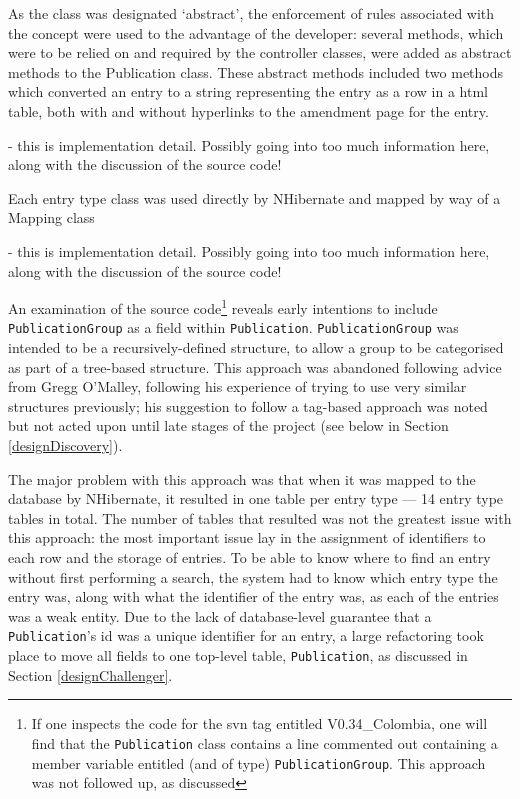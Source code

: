 As the class was designated `abstract', the enforcement of rules associated with the concept were used to the advantage of the developer: several methods, which were to be relied on and required by the controller classes, were added as abstract methods to the Publication class.  These abstract methods included two methods which converted an entry to a string representing the entry as a row in a \gls{html} table, both with and without hyperlinks to the amendment page for the entry.

\revisit - this is implementation detail. Possibly going into too much information here, along with the discussion of the source code!

Each entry type class was used directly by NHibernate and mapped by way of a Mapping class 

\revisit - this is implementation detail. Possibly going into too much information here, along with the discussion of the source code!

An examination of the source code\footnote{If one inspects the code for the \gls{svn} tag entitled V0.34\_Colombia, one will find that the \texttt{Publication} class contains a line commented out containing a member variable entitled (and of type) \texttt{PublicationGroup}.  This approach was not followed up, as discussed} reveals early intentions to include \texttt{PublicationGroup} as a field within \texttt{Publication}.  \texttt{PublicationGroup} was intended to be a recursively-defined structure, to allow a group to be categorised as part of a tree-based structure.  This approach was abandoned following advice from Gregg O'Malley, following his experience of trying to use very similar structures previously; his suggestion to follow a tag-based approach was noted but not acted upon until late stages of the project (see below in Section \ref{designDiscovery}).

The major problem with this approach was that when it was mapped to the database by NHibernate, it resulted in one table per entry type --- 14 entry type tables in total.  The number of tables that resulted was not the greatest issue with this approach: the most important issue lay in the assignment of identifiers to each row and the storage of entries.  To be able to know where to find an entry without first performing a search, the system had to know which entry type the entry was, along with what the identifier of the entry was, as each of the entries was a weak entity.  Due to the lack of database-level guarantee that a \texttt{Publication}'s id was a unique identifier for an entry, a large refactoring took place to move all fields to one top-level table, \texttt{Publication}, as discussed in Section \ref{designChallenger}.

